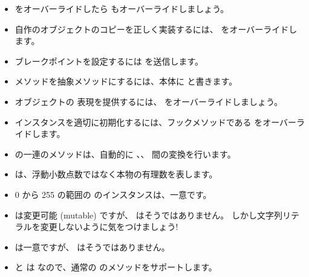 \documentclass[a4paper,10pt,twoside]{book}
\begin{document}
\begin{itemize}

  \item \ct{=} をオーバーライドしたら  もオーバーライドしましょう。

  \item 自作のオブジェクトのコピーを正しく実装するには、 をオーバーライドします。

  \item ブレークポイントを設定するには  を送信します。

  \item メソッドを抽象メソッドにするには、本体に  と書きます。

  \item オブジェクトの  表現を提供するには、 をオーバーライドしましょう。

  \item インスタンスを適切に初期化するには、フックメソッドである  をオーバーライドします。

  \item {} の一連のメソッドは、自動的に 、、 間の変換を行います。

  \item {} は、浮動小数点数ではなく本物の有理数を表します。

  \item 0 から 255 の範囲の  のインスタンスは、一意です。

  \item {} は変更可能 (mutable) ですが、 はそうではありません。
  しかし文字列リテラルを変更しないように気をつけましょう!

  \item {} は一意ですが、 はそうではありません。

  \item {} と  は  なので、通常の  のメソッドをサポートします。

\end{itemize}

\ifx\wholebook\relax\else
   
   
\end{document}

